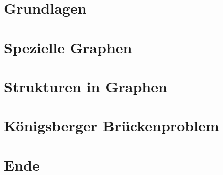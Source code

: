 \documentclass[hyperref={pdfpagelabels=false},usepdftitle=false]{beamer}
\begin{document}
\title{\titleText}
\subtitle{}
\author{\tutor}
\date{2. Juli 2013}
\subject{Diskrete Mathematik}

\frame{\titlepage}



\section{Grundlagen}


\section{Spezielle Graphen}


\section{Strukturen in Graphen}


\section{Königsberger Brückenproblem}


\section{Ende}

\end{document}
